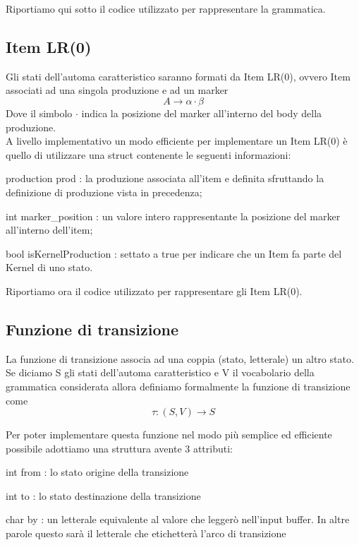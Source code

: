 \documentclass[12pt]{article}
\begin{document}
Riportiamo qui sotto il codice utilizzato per rappresentare la grammatica.




\subsection{Item LR(0)}
Gli stati dell'automa caratteristico saranno formati da Item LR(0), ovvero Item associati ad una singola produzione e ad un marker
$$
A \to \alpha\cdot\beta
$$ 
Dove il simbolo $\cdot$ indica la posizione del marker all'interno del body della produzione. \\

A livello implementativo un modo efficiente per implementare un Item LR(0) è quello di utilizzare una struct contenente le seguenti informazioni:
\begin{list}{-}{}
\item production prod : la produzione associata all'item e definita sfruttando la definizione di produzione vista in precedenza;
\item int marker\_position : un valore intero rappresentante la posizione del marker all'interno dell'item;
\item bool isKernelProduction : settato a true per indicare che un Item fa parte del Kernel di uno stato.
\end{list}

Riportiamo ora il codice utilizzato per rappresentare gli Item LR(0).


\subsection{Funzione di transizione}\label{tau}
La funzione di transizione associa ad una coppia (stato, letterale) un altro stato. Se diciamo S gli stati dell'automa caratteristico e V il vocabolario della grammatica considerata allora definiamo formalmente la funzione di transizione come
$$
\tau \colon (S, V) \to S
$$

Per poter implementare questa funzione nel modo più semplice ed efficiente possibile adottiamo una struttura avente 3 attributi:
\begin{list}{-}{}
\item int from : lo stato origine della transizione
\item int to : lo stato destinazione della transizione
\item char by : un letterale equivalente al valore che leggerò nell'input buffer. In altre parole questo sarà il letterale che etichetterà l'arco di transizione 
\end{list}
\end{document}
